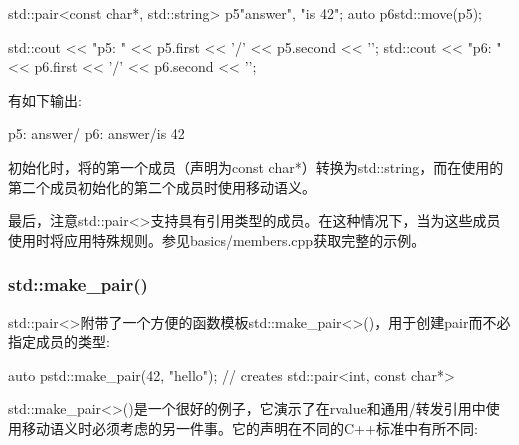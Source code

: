 \begin{cppcode}
std::pair<const char*, std::string> p5{"answer", "is 42"};
auto p6{std::move(p5)};

std::cout << "p5: " << p5.first << '/' << p5.second << '\n';
std::cout << "p6: " << p6.first << '/' << p6.second << '\n';
\end{cppcode}

有如下输出:

\begin{outputcode}
p5: answer/
p6: answer/is 42
\end{outputcode}

初始化时，将的第一个成员（声明为const char*）转换为std::string，而在使用的第二个成员初始化的第二个成员时使用移动语义。

最后，注意std::pair<>支持具有引用类型的成员。在这种情况下，当为这些成员使用时将应用特殊规则。参见basics/members.cpp获取完整的示例。

\subsubsection{std::make_pair()}

std::pair<>附带了一个方便的函数模板std::make_pair<>()，用于创建pair而不必指定成员的类型:

\begin{cppcode}
auto p{std::make_pair(42, "hello")}; // creates std::pair<int, const char*>
\end{cppcode}

std::make_pair<>()是一个很好的例子，它演示了在rvalue和通用/转发引用中使用移动语义时必须考虑的另一件事。它的声明在不同的C++标准中有所不同:

